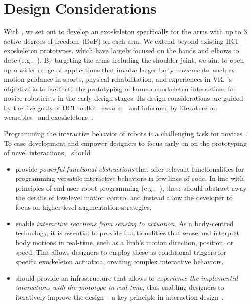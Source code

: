 
\section{Design Considerations}
With \toolkit, we set out to develop an exoskeleton specifically for the arms with up to 3 active degrees of freedom~(DoF) on each arm. We extend beyond existing HCI exoskeleton prototypes, which have largely focused on the hands and elbows to date (e.g.,~\cite{teng_2022,gu_2016,homola_2022, nishida_2022}). By targeting the arms including the shoulder joint, we aim to open up a wider range of applications that involve larger body movements, such as motion guidance in sports, physical rehabilitation, and experiences in VR. 
\toolkit's objective is to facilitate the prototyping of human-exoskeleton interactions for novice roboticists in the early design stages.
Its design considerations are guided by the five goals of HCI toolkit research~\cite{ledo_2018} and informed by literature on wearables~\cite{gemperle_1998, saberpour_2023} and exoskeletons~\cite{souza_2016,sarac_2019}:

Programming the interactive behavior of robots is a challenging task for novices~\cite{ajaykumar_2021}. To ease development and empower designers to focus early on on the prototyping of novel interactions, \toolkit~should
\begin{itemize}[leftmargin=*, noitemsep, topsep=3pt]
\item provide \textit{powerful functional abstractions} that offer relevant functionalities for programming versatile interactive behaviors in few lines of code. In line with principles of end-user robot programming (e.g.,~\cite{desantis_2008}), these should abstract away the details of low-level motion control and instead allow the developer to focus on higher-level augmentation strategies,  
\item enable \textit{interactive reactions from sensing to actuation}. As a body-centred technology, it is essential to provide functionalities that sense and interpret body motions in real-time, such as a limb's motion direction, position, or speed. This allows designers to employ these as conditional triggers for specific exoskeleton actuation, creating complex interactive behaviors.
\item should provide an infrastructure that allows to \textit{experience the implemented interactions with the prototype in real-time}, thus enabling designers to iteratively improve the design -- a key principle in interaction design~\cite{preece_2015}.
\end{itemize}

